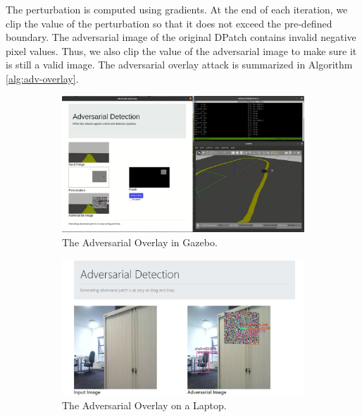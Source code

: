 The perturbation is computed using gradients. At the end of each iteration, we clip the value of the perturbation so that it does not exceed the pre-defined boundary. The adversarial image of the original DPatch \cite{liu2018dpatch} contains invalid negative pixel values. Thus, we also clip the value of the adversarial image to make sure it is still a valid image. The adversarial overlay attack is summarized in Algorithm \ref{alg:adv-overlay}.

\begin{figure}[b]
\centering
\begin{subfigure}[b]{0.31\textwidth}
    \centering
    \includegraphics[width=\textwidth]{figures/chapter_detection/gazebo.jpg}
    \caption{The Adversarial Overlay in Gazebo.}
    \label{fig:gazebo}
\end{subfigure}
\hfill
\begin{subfigure}[b]{0.31\textwidth}
    \centering
    \includegraphics[width=\textwidth]{figures/chapter_detection/pc.png}
    \caption{The Adversarial Overlay on a Laptop.}
    \label{fig:pc}
\end{subfigure}
\hfill
\begin{subfigure}[b]{0.31\textwidth}

\end{subfigure}
\end{figure}
